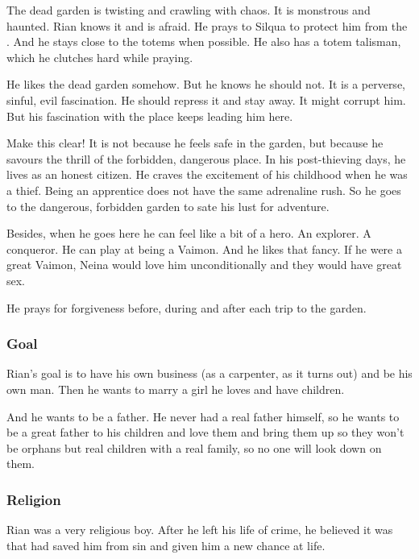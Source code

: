 The dead garden is twisting and crawling with chaos.
It is monstrous and haunted.
Rian knows it and is afraid.
He prays to Silqua to protect him from the \wylde.
And he stays close to the totems when possible.
He also has a totem talisman, which he clutches hard while praying.
    
He likes the dead garden somehow.
But he knows he should not.
It is a perverse, sinful, evil fascination. 
He should repress it and stay away.
It might corrupt him. 
But his fascination with the place keeps leading him here. 

Make this clear!
It is not because he feels safe in the garden, but because he savours the thrill of the forbidden, dangerous place. 
In his post-thieving days, he lives as an honest citizen.
He craves the excitement of his childhood when he was a thief. 
Being an apprentice does not have the same adrenaline rush.
So he goes to the dangerous, forbidden garden to sate his lust for adventure.

Besides, when he goes here he can feel like a bit of a hero.
An explorer.
A conqueror.
He can play at being a Vaimon.
And he likes that fancy.
If he were a great Vaimon, Neina would love him unconditionally and they would have great sex. 

He prays for forgiveness before, during and after each trip to the garden. 





\subsubsection{Goal}
Rian's goal is to have his own business (as a carpenter, as it turns out) and be his own man. 
Then he wants to marry a girl he loves and have children. 

And he wants to be a father. 
He never had a real father himself, so he wants to be a great father to his children and love them and bring them up so they won't be orphans but real children with a real family, so no one will look down on them. 





\subsubsection{Religion}
Rian was a very religious boy. 
After he left his life of crime, he believed it was \iquin that had saved him from sin and given him a new chance at life. 

